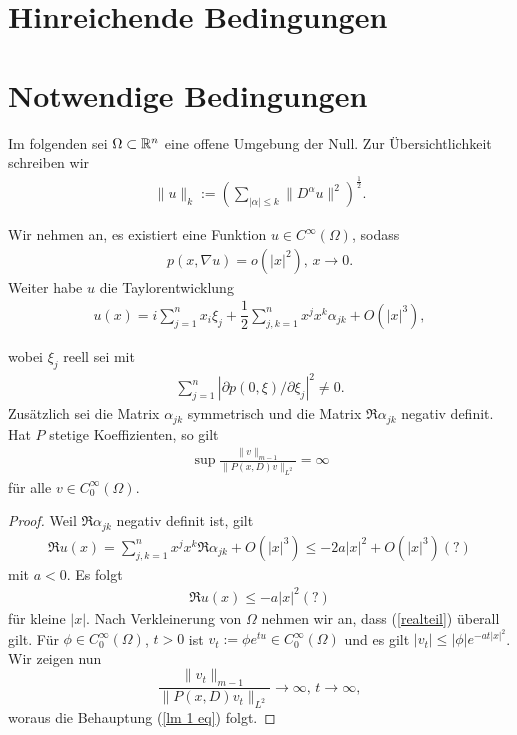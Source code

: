 \section{Hinreichende Bedingungen}
\cite{Hormander:1955}


\section{Notwendige Bedingungen}
Im folgenden sei $\Omega \subset \mathbb R^n$ eine offene Umgebung der Null. Zur Übersichtlichkeit schreiben wir
\begin{align*}
\lVert u \rVert_k := \left( \sum_{|\alpha| \le k} \lVert D^\alpha u \rVert^2 \right)^{\frac{1}{2}}.
\end{align*}
\begin{lem}
Wir nehmen an, es existiert eine Funktion $u \in C^\infty (\Omega)$, sodass 
\begin{align}
\label{grad}
p(x, \nabla u) = o \left(|x|^2\right), \, x \rightarrow 0.
\end{align}
Weiter habe $u$ die Taylorentwicklung \begin{align}
	\label{taylor}
u(x) = i \sum_{j=1}^{n} x_i \xi_j + \dfrac{1}{2} \sum_{j,k=1}^{n} x^j x^k \alpha_{jk} + O\left( |x|^3 \right),
\end{align}

wobei $\xi_j$ reell sei mit 
\begin{align}
\label{normpart}
\sum_{j=1}^{n}|\partial p(0,\xi)/\partial \xi_j|^2 \neq 0.
\end{align}
Zusätzlich sei die Matrix $\alpha_{jk}$ symmetrisch und die Matrix $\Re \alpha_{jk}$ negativ definit. Hat $P$ stetige Koeffizienten, so gilt
\begin{align}
\label{lm 1 eq}
\sup \frac{ \lVert v \rVert_{m-1} }{ \lVert P(x,D)v \rVert_{L^2}} = \infty
\end{align}
für alle $v \in C_0^\infty(\Omega)$.
\end{lem}
\begin{proof}
Weil $\Re \alpha_{jk}$ negativ definit ist, gilt\begin{align*}
\Re u(x) = \sum_{j,k=1}^{n} x^jx^k \Re \alpha_{jk} + O\left( |x|^3 \right) \le -2a |x|^2 + O\left( |x|^3 \right) (?)
\end{align*}
mit $a<0$. Es folgt
\begin{align}
\label{realteil}
\Re u(x) \le -a |x|^2 (?)
\end{align}
für kleine $|x|$. Nach Verkleinerung von $\Omega$ nehmen wir an, dass (\ref{realteil}) überall gilt. Für $\phi \in C_0^\infty(\Omega)$, $t>0$ ist $v_t := \phi e^{tu} \in C_0^\infty(\Omega)$ und es gilt $|v_t| \le |\phi| e^{-at|x|^2}$. Wir zeigen nun
\[
\frac{\lVert v_t \rVert_{m-1}}{\lVert P(x,D)v_t \rVert_{L^2}} \rightarrow \infty, \, t \rightarrow \infty,
\]
woraus die Behauptung (\ref{lm 1 eq}) folgt.
\end{proof}
